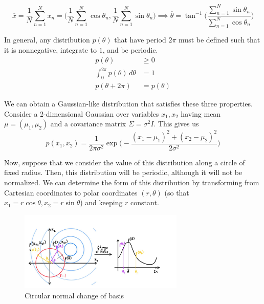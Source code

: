 \documentclass{article}
\begin{document}
    \begin{equation}
      \overline{x} = \frac{1}{N} \sum_{n=1}^N x_n = \Big( \frac{1}{N} \sum_{n=1}^N \cos{\theta_n} , \frac{1}{N} \sum_{n=1}^N \sin{\theta_n} \Big) \implies \overline{\theta} = \tan^{-1} \bigg( \frac{\sum_{n=1}^N \sin{\theta_n}}{\sum_{n=1}^N \cos{\theta_n}} \bigg)
    \end{equation}

    In general, any distribution $p(\theta)$ that have period $2\pi$ must be defined such that it is nonnegative, integrate to $1$, and be periodic.
    \begin{align*} 
      p(\theta) & \geq 0 \\
      \int_0^{2\pi} p(\theta)\,d\theta  & = 1 \\
      p(\theta + 2\pi) & = p(\theta)
    \end{align*}

    We can obtain a Gaussian-like distribution that satisfies these three properties. Consider a 2-dimensional Gaussian over variables $x_1, x_2$ having mean $\mu = (\mu_1, \mu_2)$ and a covariance matrix $\Sigma = \sigma^2 I$. This gives us
    \begin{equation}
      p(x_1, x_2) = \frac{1}{2\pi \sigma^2} \exp \bigg( -\frac{(x_1 - \mu_1)^2 + (x_2 - \mu_2)^2}{2\sigma^2} \bigg)
    \end{equation}

    Now, suppose that we consider the value of this distribution along a circle of fixed radius. Then, this distribution will be periodic, although it will not be normalized. We can determine the form of this distribution by transforming from Cartesian coordinates to polar coordinates $(r, \theta)$ (so that $x_1 = r \cos{\theta}, x_2 = r \sin{\theta}$) and keeping $r$ constant.

    \begin{figure}[H]
      \centering
      \includegraphics[width=0.7\textwidth]{img/circular_normal_change_of_basis.jpg}
      \caption{Circular normal change of basis}
    \end{figure}
\end{document}
